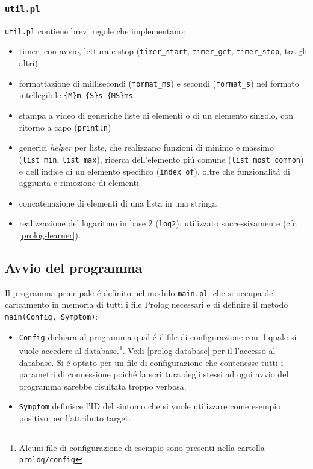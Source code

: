 \documentclass[preprint]{acm_proc_article-sp}
\begin{document}
\subsubsection{\texttt{util.pl}}
\verb|util.pl| contiene brevi regole che implementano:
\begin{itemize}
\item timer, con avvio, lettura e stop (\verb|timer_start|, \verb|timer_get|, \verb|timer_stop|, tra gli altri)
\item formattazione di millisecondi (\verb|format_ms|) e secondi (\verb|format_s|) nel formato intellegibile \texttt{\{M\}m \{S\}s \{MS\}ms}
\item stampa a video di generiche liste di elementi o di un elemento singolo, con ritorno a capo (\verb|println|)
\item generici \textit{helper} per liste, che realizzano funzioni di minimo e massimo (\verb|list_min|, \verb|list_max|), ricerca dell'elemento pi\'u comune (\verb|list_most_common|) e dell'indice di un elemento specifico (\verb|index_of|), oltre che funzionalit\'a di aggiunta e rimozione di elementi
\item concatenazione di elementi di una lista in una stringa
\item realizzazione del logaritmo in base $2$ (\verb|log2|), utilizzato successivamente (cfr. \ref{prolog-learner}).
\end{itemize}

\subsection{Avvio del programma}
\label{prolog-main}
Il programma principale \'e definito nel modulo \verb|main.pl|, che si occupa del caricamento in memoria di tutti i file Prolog necessari e di definire il metodo \verb|main(Config, Symptom)|:
\begin{itemize}
\item \verb|Config| dichiara al programma qual \'e il file di configurazione con il quale si vuole accedere al database.\footnote{Alcuni file di configurazione di esempio sono presenti nella cartella \texttt{prolog/config}}. Vedi \ref{prolog-database} per il l'accesso al database. Si \'e optato per un file di configurazione che contenesse tutti i parametri di connessione poich\'e la scrittura degli stessi ad ogni avvio del programma sarebbe risultata troppo verbosa.
\item \verb|Symptom| definisce l'ID del sintomo che si vuole utilizzare come esempio positivo per l'attributo target.
\end{itemize}
\end{document}
